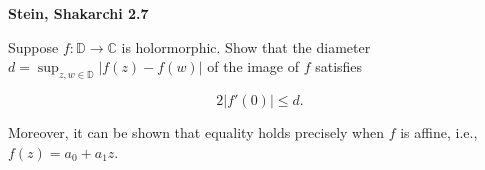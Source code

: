 \textbf{Stein, Shakarchi 2.7}

Suppose $f : \mathbb{D} \to \mathbb{C}$ is holormorphic. Show that the diameter 
$d = \sup_{z,w \in \mathbb{D}} |f(z) - f(w)|$ of the image of $f$ satisfies

$$
2 \left| f'(0) \right| \le d.
$$

Moreover, it can be shown that equality holds precisely when $f$ is affine, i.e., $f(z) = a_0 + a_1 z$.

